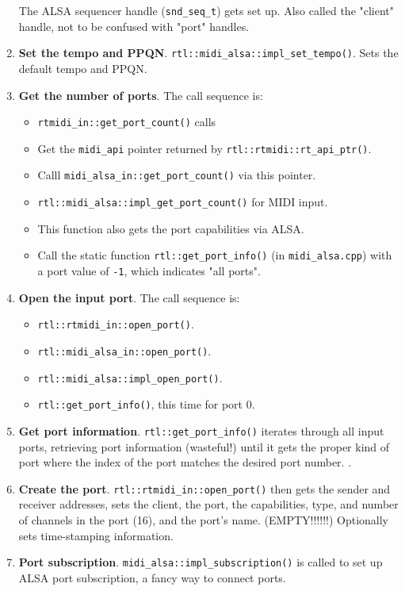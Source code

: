 \begin{enumerate}
            The ALSA sequencer handle (\texttt{snd\_seq\_t}) gets set up.
            Also called the "client" handle, not to be confused with
            "port" handles.
      \item\textbf{Set the tempo and PPQN}.
         \texttt{rtl::midi\_alsa::impl\_set\_tempo()}.
         Sets the default tempo and PPQN.
      \item \textbf{Get the number of ports}.
         The call sequence is:
         \begin{itemize}
            \item \texttt{rtmidi\_in::get\_port\_count()} calls
            \item Get the \texttt{midi\_api} pointer returned by
               \texttt{rtl::rtmidi::rt\_api\_ptr()}.
            \item Calll \texttt{midi\_alsa\_in::get\_port\_count()}
               via this pointer.
            \item \texttt{rtl::midi\_alsa::impl\_get\_port\_count()}
               for MIDI input.
            \item This function also gets the port capabilities via ALSA.
            \item Call the static function \texttt{rtl::get\_port\_info()}
               (in \texttt{midi\_alsa.cpp})
               with a port value of \texttt{-1}, which indicates "all ports".
         \end{itemize}
      \item \textbf{Open the input port}.
         The call sequence is:
         \begin{itemize}
            \item \texttt{rtl::rtmidi\_in::open\_port()}.
            \item \texttt{rtl::midi\_alsa\_in::open\_port()}.
            \item \texttt{rtl::midi\_alsa::impl\_open\_port()}.
            \item \texttt{rtl::get\_port\_info()}, this time for port 0.
         \end{itemize}
      \item \textbf{Get port information}.
         \texttt{rtl::get\_port\_info()} iterates through all input ports,
         retrieving port information (wasteful!) until it gets the 
         proper kind of port where the index of the port matches the
         desired port number.
         \texttt{}.
      \item \textbf{Create the port}.
         \texttt{rtl::rtmidi\_in::open\_port()} then gets the sender and
         receiver addresses, sets the client, the port, the capabilities, type,
         and number of channels in the port (16), and the port's name.
         (EMPTY!!!!!!)
         Optionally sets time-stamping information.
      \item \textbf{Port subscription}.
         \texttt{midi\_alsa::impl\_subscription()} is called to set up
         ALSA port subscription, a fancy way to connect ports.
   \end{enumerate}

